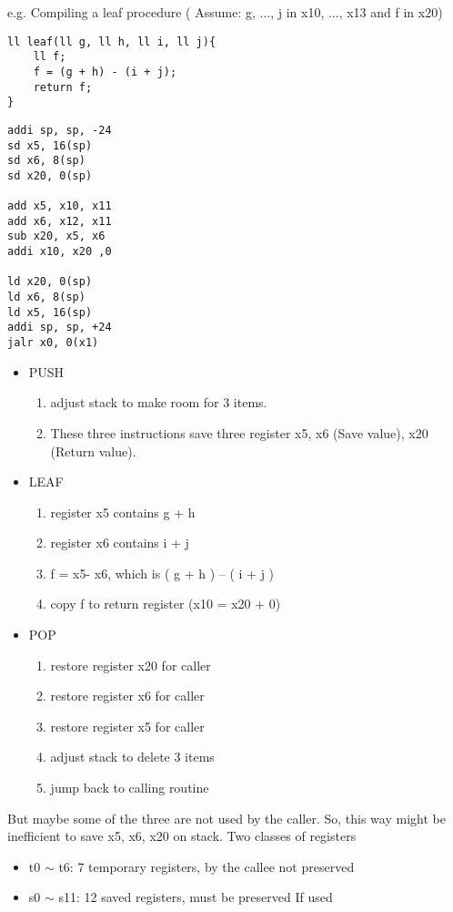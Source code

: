 e.g. Compiling a leaf procedure ( Assume: g, ..., j in x10, ..., x13 and f in x20)

\begin{lstlisting}[title={C code}]
ll leaf(ll g, ll h, ll i, ll j){
    ll f;
    f = (g + h) - (i + j);
    return f;
}
\end{lstlisting}

\begin{lstlisting}[language={[x86masm]Assembler},title={RISC-V assembly code}]
addi sp, sp, -24
sd x5, 16(sp)
sd x6, 8(sp)
sd x20, 0(sp)

add x5, x10, x11
add x6, x12, x11
sub x20, x5, x6
addi x10, x20 ,0
    
ld x20, 0(sp)
ld x6, 8(sp)
ld x5, 16(sp)
addi sp, sp, +24
jalr x0, 0(x1)
\end{lstlisting}
\begin{itemize}
    \item PUSH
    \begin{enumerate}
        \item  adjust stack to make room for 3 items. 
        \item These three instructions save three register x5, x6 (Save value), x20 (Return value). 
    \end{enumerate}
    \item LEAF
    \begin{enumerate}
        \item register x5 contains g + h
        \item register x6 contains i + j
        \item f = x5- x6, which is ( g + h ) – ( i + j )
        \item copy f to return register (x10 = x20 + 0)
    \end{enumerate}
    \item POP
    \begin{enumerate}
        \item restore register x20 for caller
        \item restore register x6 for caller
        \item restore register x5 for caller
        \item adjust stack to delete 3 items
        \item jump back to calling routine
    \end{enumerate}
\end{itemize}

But maybe some of the three are not used by the caller. So, this way might be inefficient to save x5, x6, x20 on stack. Two classes of registers
\begin{itemize}
    \item\small t0 $\sim$ t6: 7 temporary registers, by the callee not preserved
    \item\small s0 $\sim$ s11: 12 saved registers, must be preserved If used
\end{itemize}

